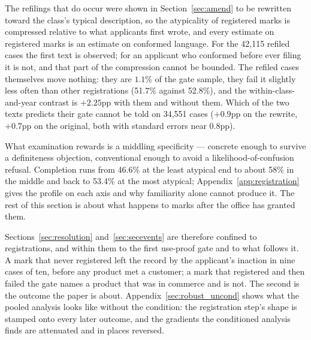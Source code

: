 The refilings that do occur were shown in Section~\ref{sec:amend} to be
rewritten toward the class's typical description, so the atypicality of
registered marks is compressed relative to what applicants first wrote,
and every estimate on registered marks is an estimate on conformed
language. For the 42{,}115 refiled cases the first text is observed; for an
applicant who conformed before ever filing it is not, and that part of the
compression cannot be bounded. The refiled cases themselves move nothing:
they are $1.1$\% of the gate sample, they fail it slightly less often than
other registrations (51.7\% against 52.8\%), and the within-class-and-year
contrast is $+2.25$pp with them and without them. Which of the two texts
predicts their gate cannot be told on 34{,}551 cases ($+0.9$pp on the
rewrite, $+0.7$pp on the original, both with standard errors near
$0.8$pp).

What examination rewards is a middling specificity --- concrete enough to
survive a definiteness objection, conventional enough to avoid a
likelihood-of-confusion refusal. Completion runs from 46.6\% at the least
atypical end to about 58\% in the middle and back to 53.4\% at the most
atypical; Appendix~\ref{app:registration} gives the profile on each axis and
why familiarity alone cannot produce it. The rest of this section is about what
happens to marks after the office has granted them.


Sections~\ref{sec:resolution} and~\ref{sec:secevents} are therefore
confined to registrations, and within them to the first use-proof gate and to
what follows it. A mark that never registered left the record by the
applicant's inaction in nine cases of ten, before any product met a
customer; a mark that registered and then failed the gate names a product
that was in commerce and is not. The second is the outcome the paper is
about. Appendix~\ref{sec:robust_uncond} shows what the pooled analysis looks like
without the condition: the registration step's shape is stamped onto every
later outcome, and the gradients the conditioned analysis finds are
attenuated and in places reversed.
